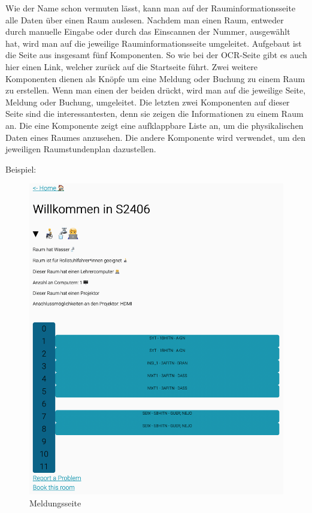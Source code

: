 Wie der Name schon vermuten lässt, kann man auf der Rauminformationsseite alle Daten über einen Raum auslesen. Nachdem man einen Raum, entweder durch manuelle Eingabe oder durch das Einscannen der Nummer, ausgewählt hat, wird man auf die jeweilige Rauminformationsseite umgeleitet. Aufgebaut ist die Seite aus insgesamt fünf Komponenten. So wie bei der OCR-Seite gibt es auch hier einen Link, welcher zurück auf die Startseite führt. Zwei weitere Komponenten dienen als Knöpfe um eine Meldung oder Buchung zu einem Raum zu erstellen. Wenn man einen der beiden drückt, wird man auf die jeweilige Seite, Meldung oder Buchung, umgeleitet. Die letzten zwei Komponenten auf dieser Seite sind die interessantesten, denn sie zeigen die Informationen zu einem Raum an. Die eine Komponente zeigt eine aufklappbare Liste an, um die physikalischen Daten eines Raumes anzusehen. Die andere Komponente wird verwendet, um den jeweiligen Raumstundenplan dazustellen.

Beispiel: %

\begin{figure}[H]
    \centering
    \includegraphics[width=120mm]{media/WebComponents/Rauminformationsseite_light.png}
    \caption{Meldungsseite}
\end{figure}

